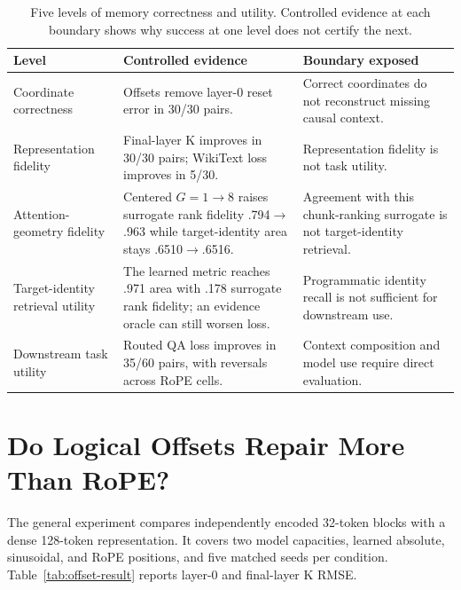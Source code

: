 \documentclass[11pt]{article}
\begin{document}
\begin{table}[H]
\centering
\small
\caption{Five levels of memory correctness and utility. Controlled evidence at each boundary
shows why success at one level does not certify the next.}
\label{tab:decomposition}
\begin{tabularx}{\textwidth}{>{\raggedright\arraybackslash}p{}>{\raggedright\arraybackslash}p{}X}
\toprule
Level & Controlled evidence & Boundary exposed \\
\midrule
Coordinate correctness & Offsets remove layer-0 reset error in 30/30 pairs. & Correct coordinates
do not reconstruct missing causal context. \\
Representation fidelity & Final-layer K improves in 30/30 pairs; WikiText loss improves in
5/30. & Representation fidelity is not task utility. \\
Attention-geometry fidelity & Centered $G=1\rightarrow8$ raises surrogate rank fidelity
.794$\rightarrow$.963 while target-identity area stays .6510$\rightarrow$.6516. & Agreement
with this chunk-ranking surrogate is not target-identity retrieval. \\
Target-identity retrieval utility & The learned metric reaches .971 area with .178 surrogate
rank fidelity; an evidence oracle can still worsen loss. & Programmatic identity recall is not
sufficient for downstream use. \\
Downstream task utility & Routed QA loss improves in 35/60 pairs, with reversals across RoPE
cells. & Context composition and model use require direct evaluation. \\
\bottomrule
\end{tabularx}
\end{table}

\section{Do Logical Offsets Repair More Than RoPE?}
\label{sec:offset-results}

The general experiment compares independently encoded 32-token blocks with a dense
128-token representation. It covers two model capacities, learned absolute, sinusoidal, and
RoPE positions, and five matched seeds per condition. Table~\ref{tab:offset-result} reports
layer-0 and final-layer K RMSE.
\end{document}
